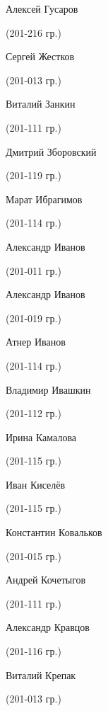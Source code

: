 \begin{multicols}{2}
\begin{small}
\begin{enumerate*}
	\item Алексей Гусаров\begin{tiny} (201-216 гр.)\end{tiny}
	\item Сергей Жестков\begin{tiny} (201-013 гр.)\end{tiny}
	\item Виталий Занкин\begin{tiny} (201-111 гр.)\end{tiny}
	\item Дмитрий Зборовский\begin{tiny} (201-119 гр.)\end{tiny}
	\item Марат Ибрагимов\begin{tiny} (201-114 гр.)\end{tiny}
	\item Александр Иванов\begin{tiny} (201-011 гр.)\end{tiny}
	\item Александр Иванов\begin{tiny} (201-019 гр.)\end{tiny}
	\item Атнер Иванов\begin{tiny} (201-114 гр.)\end{tiny}
	\item Владимир Ивашкин\begin{tiny} (201-112 гр.)\end{tiny}
	\item Ирина Камалова\begin{tiny} (201-115 гр.)\end{tiny}
	\item Иван Киселёв\begin{tiny} (201-115 гр.)\end{tiny}
	\item Константин Ковальков\begin{tiny} (201-015 гр.)\end{tiny}
	\item Андрей Кочетыгов\begin{tiny} (201-111 гр.)\end{tiny}
	\item Александр Кравцов\begin{tiny} (201-116 гр.)\end{tiny}
	\item Виталий Крепак\begin{tiny} (201-013 гр.)\end{tiny}

\end{enumerate*}
\end{small}
\end{multicols}
